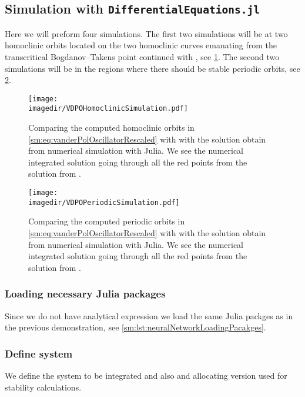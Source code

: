 \subsection{Simulation with {\tt DifferentialEquations.jl}}
Here we will preform four simulations. The first two simulations will be at two
homoclinic orbits located on the two homoclinic curves emanating from the
transcritical Bogdanov--Takens point continued with \DDEBIFTOOL, see
\cref{sm:fig:VDPOSimulationHomoclinic}. The second two simulations will be in
the regions where there should be stable periodic orbits, see
\cref{sm:fig:VDPOPeriodicSimulation}.

\begin{figure}[ht]
    \centering
    \texttt{[image: \\imagedir/VDPOHomoclinicSimulation.pdf]}
    \caption{Comparing the computed homoclinic orbits in \cref{sm:eq:vanderPolOscillatorRescaled}
    with \DDEBIFTOOL with the solution obtain from numerical simulation with Julia.
    We see the numerical integrated solution
    going through all the red points from the solution from \DDEBIFTOOL.}
    \label{sm:fig:VDPOSimulationHomoclinic}
\end{figure}

\begin{figure}[ht]
    \centering
    \texttt{[image: \\imagedir/VDPOPeriodicSimulation.pdf]}
    \caption{Comparing the computed periodic orbits in \cref{sm:eq:vanderPolOscillatorRescaled}
    with \DDEBIFTOOL with the solution obtain from numerical simulation with Julia.
    We see the numerical integrated solution
    going through all the red points from the solution from \DDEBIFTOOL.}
    \label{sm:fig:VDPOPeriodicSimulation}
\end{figure}

\subsubsection{Loading necessary Julia packages}
Since we do not have analytical expression we load the same Julia packges as in
the previous demonstration, see \cref{sm:lst:neuralNetworkLoadingPacakges}.

\subsubsection{Define system}
We define the system to be integrated and also and allocating version used for
stability calculations.
\inputminted[firstline=8, lastline=30]{julia}{\pathToJuliaFiles/vdpo_simulation_article.jl}

